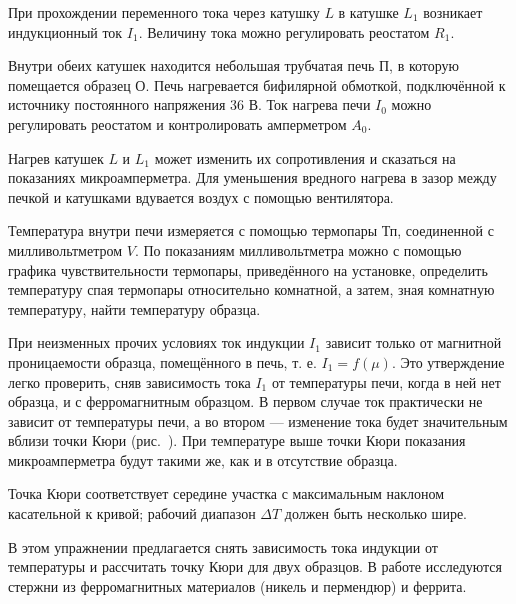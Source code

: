 При прохождении переменного тока через катушку $L$ в катушке $L_1$ возникает
индукционный ток $I_1$. Величину тока можно регулировать реостатом $R_1$.

Внутри обеих катушек находится небольшая трубчатая печь $\text{П}$, в которую
помещается образец $\text{О}$. Печь нагревается бифилярной обмоткой,
подключённой к источнику постоянного напряжения 36 В. Ток нагрева печи $I_0$
можно
регулировать реостатом и контролировать амперметром $A_0$.

Нагрев катушек $L$ и $L_1$ может изменить их сопротивления и сказаться на
показаниях микроамперметра. Для уменьшения
вредного нагрева в зазор между печкой и катушками вдувается воздух с помощью
вентилятора.

Температура внутри печи измеряется с помощью термопары $\text{Тп}$, соединенной
с милливольтметром $V$. По показаниям милливольтметра можно с помощью графика
чувствительности термопары, приведённого на установке, определить температуру
спая термопары относительно комнатной, а затем, зная комнатную температуру,
найти температуру образца.

При неизменных прочих условиях ток индукции $I_1$ зависит только от магнитной
проницаемости образца, помещённого в печь, т. е. $I_1 = f(\mu)$. Это
утверждение легко проверить, сняв зависимость тока $I_1$ от температуры печи,
когда в ней нет образца, и с ферромагнитным образцом. В первом случае ток
практически не зависит от температуры печи, а во втором --- изменение тока будет
значительным вблизи точки Кюри (рис.~). При температуре выше точки Кюри показания микроамперметра будут
такими же, как и в отсутствие образца.

Точка Кюри соответствует середине участка с максимальным наклоном касательной к
кривой; рабочий диапазон $\Delta T$ должен быть несколько шире.

\labtask

В этом упражнении предлагается снять зависимость тока индукции от температуры и
рассчитать точку Кюри для двух образцов. В работе исследуются стержни из
ферромагнитных материалов (никель и пермендюр) и феррита.

